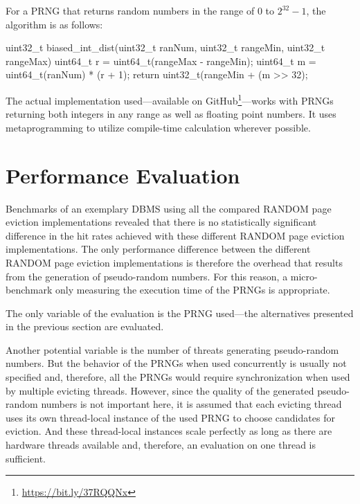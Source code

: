     For a PRNG that returns random numbers in the range of $0$ to $2^{32} - 1$, the algorithm is as follows:
\begin{@empty}
    \lstset{
        language = [ISO]C++
    }
\begin{centeredshadowboxlisting}
uint32_t biased_int_dist(uint32_t ranNum,
                         uint32_t rangeMin,
                         uint32_t rangeMax) {
    uint64_t r = uint64_t(rangeMax - rangeMin);
    uint64_t m = uint64_t(ranNum) * (r + 1);
    return uint32_t(rangeMin + (m >> 32);
}
\end{centeredshadowboxlisting}
\end{@empty}
    The actual implementation used---available on GitHub\footnote{\url{https://bit.ly/37RQQNx}}---works with PRNGs returning both integers in any range as well as floating point numbers. It uses metaprogramming to utilize compile-time calculation wherever possible.

\section[Performance Evaluation]{Performance Evaluation} \label{sec:random-performance}

    Benchmarks of an exemplary DBMS using all the compared RANDOM page eviction implementations revealed that there is no statistically significant difference in the hit rates achieved with these different RANDOM page eviction implementations. The only performance difference between the different RANDOM page eviction implementations is therefore the overhead that results from the generation of pseudo-random numbers. For this reason, a micro-benchmark only measuring the execution time of the PRNGs is appropriate.

    The only variable of the evaluation is the PRNG used---the alternatives presented in the previous section are evaluated.

    Another potential variable is the number of threats generating pseudo-random numbers. But the behavior of the PRNGs when used concurrently is usually not specified and, therefore, all the PRNGs would require synchronization when used by multiple evicting threads. However, since the quality of the generated pseudo-random numbers is not important here, it is assumed that each evicting thread uses its own thread-local instance of the used PRNG to choose candidates for eviction. And these thread-local instances scale perfectly as long as there are hardware threads available and, therefore, an evaluation on one thread is sufficient.

